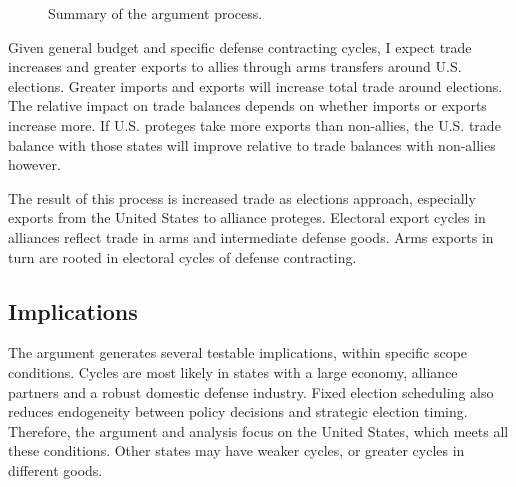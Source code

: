 \documentclass[12pt]{article}
\begin{document}
\begin{figure}[htpb]
\caption{Summary of the argument process.}
\label{fig:arg-process}
\end{figure}




Given general budget and specific defense contracting cycles, I expect trade increases and greater exports to allies through arms transfers around U.S. elections.
Greater imports and exports will increase total trade around elections. 
The relative impact on trade balances depends on whether imports or exports increase more. 
If U.S. proteges take more exports than non-allies, the U.S. trade balance with those states will improve relative to trade balances with non-allies however.


The result of this process is increased trade as elections approach, especially exports from the United States to alliance proteges.
Electoral export cycles in alliances reflect trade in arms and intermediate defense goods. 
Arms exports in turn are rooted in electoral cycles of defense contracting.



\subsection{Implications}



The argument generates several testable implications, within specific scope conditions. 
Cycles are most likely in states with a large economy, alliance partners and a robust domestic defense industry. 
Fixed election scheduling also reduces endogeneity between policy decisions and strategic election timing.
Therefore, the argument and analysis focus on the United States, which meets all these conditions.
Other states may have weaker cycles, or greater cycles in different goods.
\end{document}
